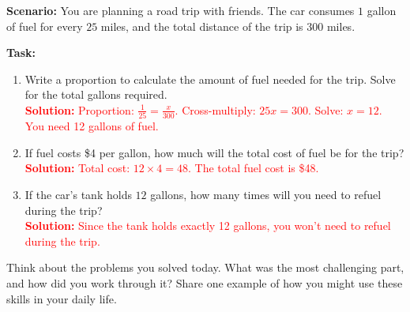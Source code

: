 \documentclass[12pt]{article}
\begin{document}
\begin{tcolorbox}[colframe=black!60, colback=white, 
coltitle=black, colbacktitle=black!15, fonttitle=\bfseries\Large, 
title=Performance Task: Planning a Road Trip, halign title=center, left=10pt, right=10pt, top=10pt, bottom=80pt]
\textbf{Scenario:} You are planning a road trip with friends. The car consumes \( 1 \) gallon of fuel for every \( 25 \) miles, and the total distance of the trip is \( 300 \) miles.

\textbf{Task:}
\begin{enumerate}[itemsep=5em]
    \item Write a proportion to calculate the amount of fuel needed for the trip. Solve for the total gallons required.\\
    \textcolor{red}{\textbf{Solution:} Proportion: \( \frac{1}{25} = \frac{x}{300} \). Cross-multiply: \( 25x = 300 \). Solve: \( x = 12 \). You need 12 gallons of fuel.}

    \item If fuel costs \$4 per gallon, how much will the total cost of fuel be for the trip?\\
    \textcolor{red}{\textbf{Solution:} Total cost: \( 12 \times 4 = 48 \). The total fuel cost is \$48.}

    \item If the car’s tank holds \( 12 \) gallons, how many times will you need to refuel during the trip?\\
    \textcolor{red}{\textbf{Solution:} Since the tank holds exactly 12 gallons, you won’t need to refuel during the trip.}
\end{enumerate}
\end{tcolorbox}

\begin{tcolorbox}[colframe=black!60, colback=white, 
coltitle=black, colbacktitle=black!15, fonttitle=\bfseries\Large, 
title=Reflection, halign title=center, left=10pt, right=10pt, top=10pt, bottom=100pt]
Think about the problems you solved today. What was the most challenging part, and how did you work through it? Share one example of how you might use these skills in your daily life.
\end{tcolorbox}
\end{document}
